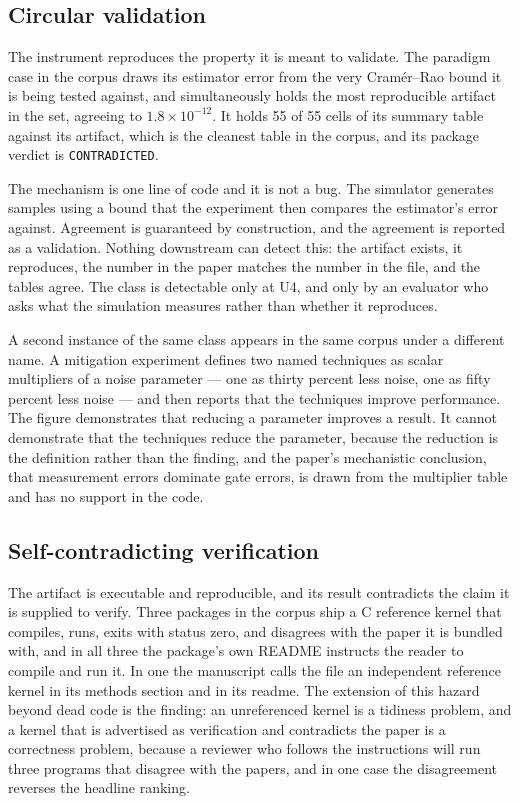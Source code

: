 \documentclass[sigconf,review]{acmart}
\begin{document}
\subsection{Circular validation}
\label{sec:tax-circular}

The instrument reproduces the property it is meant to validate. The paradigm
case in the corpus draws its estimator error from the very Cram\'er--Rao
bound it is being tested against, and simultaneously holds the most
reproducible artifact in the set, agreeing to $1.8\times10^{-12}$. It holds
55 of 55 cells of its summary table against its artifact, which is the
cleanest table in the corpus, and its package verdict is
\texttt{CONTRADICTED}.

The mechanism is one line of code and it is not a bug. The simulator
generates samples using a bound that the experiment then compares the
estimator's error against. Agreement is guaranteed by construction, and the
agreement is reported as a validation. Nothing downstream can detect this: the
artifact exists, it reproduces, the number in the paper matches the number in
the file, and the tables agree. The class is detectable only at U4, and only by
an evaluator who asks what the simulation measures rather than whether it
reproduces.

A second instance of the same class appears in the same corpus under a
different name. A mitigation experiment defines two named techniques as
scalar multipliers of a noise parameter --- one as thirty percent less noise,
one as fifty percent less noise --- and then reports that the techniques
improve performance. The figure demonstrates that reducing a parameter
improves a result. It cannot demonstrate that the techniques reduce the
parameter, because the reduction is the definition rather than the finding,
and the paper's mechanistic conclusion, that measurement errors dominate gate
errors, is drawn from the multiplier table and has no support in the code.

\subsection{Self-contradicting verification}
\label{sec:tax-contradictory}

The artifact is executable and reproducible, and its result contradicts the
claim it is supplied to verify. Three packages in the corpus ship a C
reference kernel that compiles, runs, exits with status zero, and disagrees
with the paper it is bundled with, and in all three the package's own README
instructs the reader to compile and run it. In one the manuscript calls the
file an independent reference kernel in its methods section and in its
readme. The extension of this hazard beyond dead code is the finding: an
unreferenced kernel is a tidiness problem, and a kernel that is advertised as
verification and contradicts the paper is a correctness problem, because a
reviewer who follows the instructions will run three programs that disagree
with the papers, and in one case the disagreement reverses the headline
ranking.
\end{document}
